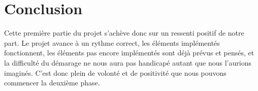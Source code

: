 \documentclass[12pt]{report}
\begin{document}
\chapter{Conclusion}

Cette première partie du projet s'achève donc sur un ressenti positif de notre part. Le projet avance à un rythme correct, les éléments implémentés fonctionnent, les éléments pas encore implémentés sont déjà prévus et pensés, et la difficulté du démarage ne nous aura pas handicapé autant que nous l'aurions imaginés. C'est donc plein de volonté et de positivité que nous pouvons commencer la deuxième phase.
\end{document}
